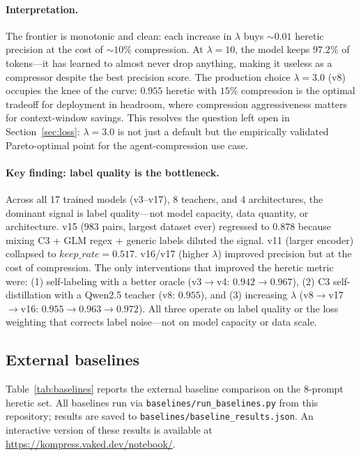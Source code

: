 \paragraph{Interpretation.} The frontier is monotonic and clean: each
increase in $\lambda$ buys ${\sim}0.01$ heretic precision at the cost of
${\sim}10\%$ compression. At $\lambda{=}10$, the model keeps $97.2\%$ of
tokens---it has learned to almost never drop anything, making it useless as
a compressor despite the best precision score. The production choice
$\lambda{=}3.0$ (v8) occupies the knee of the curve: $0.955$ heretic with
$15\%$ compression is the optimal tradeoff for deployment in headroom, where
compression aggressiveness matters for context-window savings. This resolves
the question left open in Section~\ref{sec:loss}: $\lambda{=}3.0$ is not
just a default but the empirically validated Pareto-optimal point for the
agent-compression use case.

\paragraph{Key finding: label quality is the bottleneck.} Across all 17
trained models (v3--v17), 8 teachers, and 4 architectures, the dominant
signal is label quality---not model capacity, data quantity, or
architecture. v15 (983 pairs, largest dataset ever) regressed to $0.878$
because mixing C3 + GLM regex + generic labels diluted the signal. v11
(larger encoder) collapsed to $\mathit{keep\_rate}{=}0.517$. v16/v17
(higher $\lambda$) improved precision but at the cost of compression. The
only interventions that improved the heretic metric were: (1) self-labeling
with a better oracle (v3$\to$v4: $0.942\to0.967$), (2) C3 self-distillation
with a Qwen2.5 teacher (v8: $0.955$), and (3) increasing $\lambda$
(v8$\to$v17$\to$v16: $0.955\to0.963\to0.972$). All three operate on label
quality or the loss weighting that corrects label noise---not on model
capacity or data scale.

\subsection{External baselines}
\label{sec:baselines}

Table~\ref{tab:baselines} reports the external baseline comparison on the
8-prompt heretic set. All baselines run via
\texttt{baselines/run\_baselines.py} from this repository; results are saved
to \texttt{baselines/baseline\_results.json}. An interactive version of these
results is available at
\url{https://kompress.vaked.dev/notebook/}.

